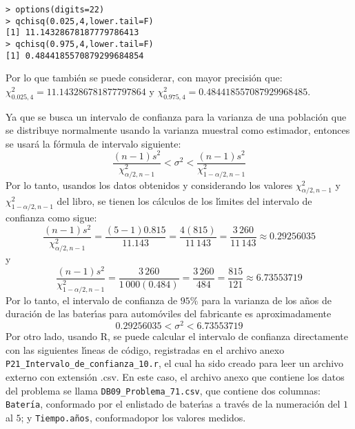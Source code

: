 \begin{solucion}
 \begin{verbatim}
> options(digits=22)
> qchisq(0.025,4,lower.tail=F)
[1] 11.14328678187779786413
> qchisq(0.975,4,lower.tail=F)
[1] 0.4844185570879299684854
 \end{verbatim}
 \vspace{-0.5cm}
 Por lo que tambi\'en se puede considerar, con mayor precisi\'on que: $\chi^2_{0.025,4} = 11.143286781877797864$ y $\chi^2_{0.975,4} = 0.484418557087929968485$.
 \par 
 Ya que se busca un intervalo de confianza para la varianza de una poblaci\'on que se distribuye normalmente usando la varianza muestral como estimador, entonces se usar\'a la f\'ormula de intervalo siguiente:
 \begin{equation*}
  \frac{(n-1)s^2}{\chi^2_{\alpha/2,n-1}} < \sigma^2 < \frac{(n-1)s^2}{\chi^2_{1-\alpha/2,n-1}}
 \end{equation*}
 Por lo tanto, usandos los datos obtenidos y considerando los valores $\chi^2_{\alpha/2,n-1}$ y $\chi^2_{1-\alpha/2,n-1}$ del libro, se tienen los c\'alculos de los l\'{\i}mites del intervalo de confianza como sigue:
 \begin{equation*}
  \frac{(n-1)s^2}{\chi^2_{\alpha/2,n-1}} = \frac{(5-1)0.815}{11.143} = \frac{4(815)}{11\,143} = \frac{3\,260}{11\,143} \approx 0.29256035
 \end{equation*}
 y
 \begin{equation*}
  \frac{(n-1)s^2}{\chi^2_{1-\alpha/2,n-1}} = \frac{3\,260}{1\,000(0.484)} = \frac{3\,260}{484} = \frac{815}{121} \approx 6.73553719
 \end{equation*}
 Por lo tanto, el intervalo de confianza de $95\%$ para la varianza de los a\~nos de duraci\'on de las bater\'{\i}as para autom\'oviles del fabricante es aproximadamente
 \begin{equation*}
  0.29256035 < \sigma^2 < 6.73553719
 \end{equation*}
 Por otro lado, usando R, se puede calcular el intervalo de confianza directamente con las siguientes l\'{\i}neas de c\'odigo, registradas en el archivo anexo \texttt{P21\_Intervalo\_de\_confianza\_10.r}, el cual ha sido creado para leer un archivo externo con extensi\'on .csv. En este caso, el archivo anexo que contiene los datos del problema se llama \texttt{DB09\_Problema\_71.csv}, que contiene dos columnas: \texttt{Bater\'{\i}a}, conformado por el enlistado de bater\'{\i}as a trav\'es de la numeraci\'on del $1$ al $5$; y \texttt{Tiempo.a\~nos}, conformadopor los valores medidos.
 \par 

\end{solucion}
